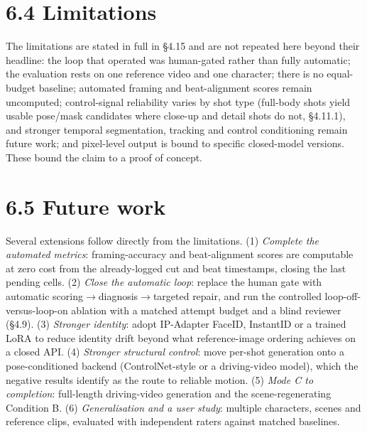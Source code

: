 \documentclass[10pt,twocolumn,letterpaper]{article}
\begin{document}

\section*{6.4 Limitations}

The limitations are stated in full in \S{}4.15 and are not repeated here beyond their headline: the loop that operated was human-gated rather than fully automatic; the evaluation rests on one reference video and one character; there is no equal-budget baseline; automated framing and beat-alignment scores remain uncomputed; control-signal reliability varies by shot type (full-body shots yield usable pose/mask candidates where close-up and detail shots do not, \S{}4.11.1), and stronger temporal segmentation, tracking and control conditioning remain future work; and pixel-level output is bound to specific closed-model versions. These bound the claim to a proof of concept.


\section*{6.5 Future work}

Several extensions follow directly from the limitations. (1) \emph{Complete the automated metrics}: framing-accuracy and beat-alignment scores are computable at zero cost from the already-logged cut and beat timestamps, closing the last pending cells. (2) \emph{Close the automatic loop}: replace the human gate with automatic scoring$\rightarrow$diagnosis$\rightarrow$targeted repair, and run the controlled loop-off-versus-loop-on ablation with a matched attempt budget and a blind reviewer (\S{}4.9). (3) \emph{Stronger identity}: adopt IP-Adapter FaceID, InstantID or a trained LoRA to reduce identity drift beyond what reference-image ordering achieves on a closed API. (4) \emph{Stronger structural control}: move per-shot generation onto a pose-conditioned backend (ControlNet-style or a driving-video model), which the negative results identify as the route to reliable motion. (5) \emph{Mode C to completion}: full-length driving-video generation and the scene-regenerating Condition B. (6) \emph{Generalisation and a user study}: multiple characters, scenes and reference clips, evaluated with independent raters against matched baselines.

\end{document}
